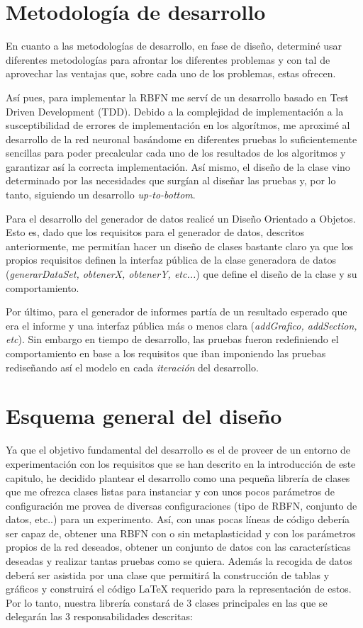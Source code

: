 \documentclass[10pt,a4paper]{report}
\begin{document}
\section{Metodología de desarrollo}
En cuanto a las metodologías de desarrollo, en fase de diseño, determiné usar diferentes metodologías para afrontar los diferentes problemas y con tal de aprovechar las ventajas que, sobre cada uno de los problemas, estas ofrecen.

Así pues, para implementar la RBFN me serví de un desarrollo basado en Test Driven Development (TDD). Debido a la complejidad de implementación a la susceptibilidad de errores de implementación en los algorítmos, me aproximé al desarrollo de la red neuronal basándome en diferentes pruebas lo suficientemente sencillas para poder precalcular cada uno de los resultados de los algoritmos y garantizar así la correcta implementación. Así mismo, el diseño de la clase vino determinado por las necesidades que surgían al diseñar las pruebas y, por lo tanto, siguiendo un desarrollo \textit{up-to-bottom}.

Para el desarrollo del generador de datos realicé un Diseño Orientado a Objetos. Esto es, dado que los requisitos para el generador de datos, descritos anteriormente, me permitían hacer un diseño de clases bastante claro ya que los propios requisitos definen la interfaz pública de la clase generadora de datos (\textit{generarDataSet, obtenerX, obtenerY, etc...}) que define el diseño de la clase y su comportamiento.

Por último, para el generador de informes partía de un resultado esperado que era el informe y una interfaz pública más o menos clara (\textit{addGrafico, addSection, etc}). Sin embargo en tiempo de desarrollo, las pruebas fueron redefiniendo el comportamiento en base a los requisitos que iban imponiendo las pruebas rediseñando así el modelo en cada \textit{iteración} del desarrollo.

\section{Esquema general del diseño}
Ya que el objetivo fundamental del desarrollo es el de proveer de un entorno de experimentación con los requisitos que se han descrito en la introducción de este capitulo, he decidido plantear el desarrollo como una pequeña librería de clases que me ofrezca clases listas para instanciar y con unos pocos parámetros de configuración me provea de diversas configuraciones (tipo de RBFN, conjunto de datos, etc..) para un experimento. Así, con unas pocas líneas de código debería ser capaz de, obtener una RBFN con o sin metaplasticidad y con los parámetros propios de la red deseados, obtener un conjunto de datos con las características deseadas y realizar tantas pruebas como se quiera. Además la recogida de datos deberá ser asistida por una clase que permitirá la construcción de tablas y gráficos y construirá el código LaTeX requerido para la representación de estos.
Por lo tanto, nuestra librería constará de 3 clases principales en las que se delegarán las 3 responsabilidades descritas:
\end{document}
